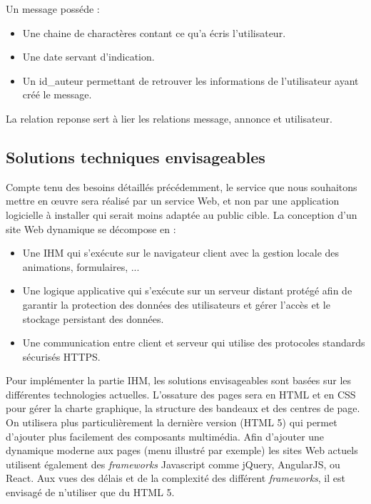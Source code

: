 \documentclass[a4paper,11pt]{article}
\begin{document}
Un message posséde :
\begin{itemize}
    \item Une chaine de charactères contant ce qu'a écris l'utilisateur.
    \item Une date servant d'indication.
    \item Un id\_auteur permettant de retrouver les informations de l'utilisateur ayant créé le message.
\end{itemize}

La relation reponse sert à lier les relations message, annonce et utilisateur.

\subsection{Solutions techniques envisageables}

Compte tenu des besoins détaillés précédemment, le service que nous souhaitons mettre en œuvre
sera réalisé par un service Web, et non par une application logicielle à installer qui serait moins
adaptée au public cible. La conception d’un site Web dynamique se décompose en : \\

\begin{itemize}
  \item Une IHM qui s’exécute sur le navigateur client avec la gestion locale des animations, formulaires, ...
  \item Une logique applicative qui s’exécute sur un serveur distant protégé afin de garantir la protection
  des données des utilisateurs et gérer l’accès et le stockage persistant des données.
  \item Une communication entre client et serveur qui utilise des protocoles standards sécurisés HTTPS.
\end{itemize}


Pour implémenter la partie IHM, les solutions envisageables sont basées sur les différentes
technologies actuelles.
L’ossature des pages sera en HTML et en CSS pour gérer la charte graphique, la structure des
bandeaux et des centres de page. On utilisera plus particulièrement la dernière version (HTML 5) qui permet
d’ajouter plus facilement des composants multimédia. Afin d’ajouter une dynamique moderne aux
pages (menu illustré par exemple) les sites Web actuels utilisent également des \textit{frameworks} Javascript
comme jQuery, AngularJS, ou React. Aux vues des délais et de la complexité des différent \textit{frameworks},
il est envisagé de n’utiliser que du HTML 5.\\
\end{document}
